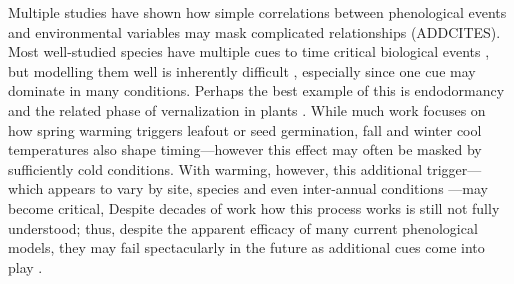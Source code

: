 \documentclass[11pt,letterpaper]{article}
\begin{document}
Multiple studies have shown how simple correlations between phenological events and environmental variables may mask complicated relationships \citep{Cook:2012pnas}(ADDCITES). Most well-studied species have multiple cues to time critical biological events \citep{chuinearees}, but modelling them well is inherently difficult \citep{chuine2016}, especially since one cue may dominate in many conditions. Perhaps the best example of this is endodormancy and the related phase of vernalization in plants \citep{chuine2016,Burghardt2015}. While much work focuses on how spring warming triggers leafout or seed germination, fall and winter cool temperatures also shape timing---however this effect may often be masked by sufficiently cold conditions. With warming, however, this additional trigger---which appears to vary by site, species and even inter-annual conditions \citep{Burghardt2015}---may become critical, Despite decades of work how this process works is still not fully understood; thus, despite the apparent efficacy of many current phenological models, they may fail spectacularly in the future as additional cues come into play \citep{chuine2016}.\\
\end{document}
